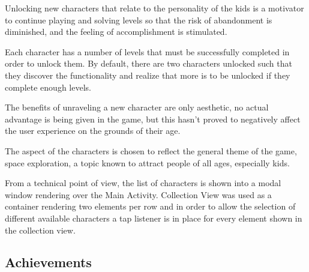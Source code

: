 \documentclass[12 pct]{report}
\begin{document}
Unlocking new characters that relate to the personality of the kids is a motivator to continue playing and solving levels so that the risk of abandonment is diminished, and the feeling of accomplishment is stimulated.

Each character has a number of levels that must be successfully completed in order to unlock them.  By default, there are two characters unlocked such that they discover the functionality and realize that more is to be unlocked if they complete enough levels.

The benefits of unraveling a new character are only aesthetic, no actual advantage is being given in the game, but this hasn't proved to negatively affect the user experience on the grounds of their age.

The aspect of the characters is chosen to reflect the general theme of the game, space exploration, a topic known to attract people of all ages, especially kids.

From a technical point of view, the list of characters is shown into a modal window rendering over the Main Activity. Collection View was used as a container rendering two elements per row and in order to allow the selection of different available characters a tap listener is in place for every element shown in the collection view.

\subsection*{Achievements}
 
\end{document}
